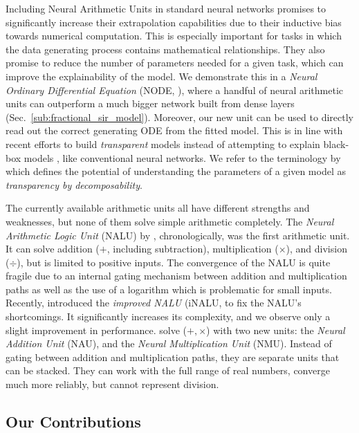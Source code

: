 \documentclass[9pt]{article}
\begin{document}
Including Neural Arithmetic Units in standard neural networks promises to
significantly increase their extrapolation capabilities due to their inductive
bias towards numerical computation. This is especially important for tasks in which
the data generating process contains mathematical relationships.  They also
promise to reduce the number of parameters needed for a given
task, which can improve the explainability of the model.
We demonstrate this in a \emph{Neural Ordinary Differential Equation} (NODE,
\cite{chen_neural_2019}), where a handful of neural arithmetic units can
outperform a much bigger network built from dense layers (Sec.~\ref{sub:fractional_sir_model}).
Moreover, our new unit can be used to directly read out the correct generating ODE
from the fitted model.  This is in line with recent efforts to build
\emph{transparent} models instead of attempting to explain black-box models
\citep{rudin_stop_2019}, like conventional neural networks.
We refer to the terminology by \cite{lipton_mythos_2017} which defines the
potential of understanding the parameters of a given model as \emph{transparency by decomposability}.

The currently available arithmetic units all have different strengths and
weaknesses, but none of them solve simple arithmetic completely.
The \emph{Neural Arithmetic Logic Unit} (NALU) by \cite{trask_neural_2018},
chronologically, was the first arithmetic unit. It can solve
addition ($+$, including subtraction), multiplication ($\times$), and division
($\div$), but is limited to positive inputs. The convergence of the
NALU is quite fragile due to an internal gating mechanism between addition and
multiplication paths as well as the use of a logarithm which is problematic for
small inputs.  Recently, \cite{schlor_inalu_2020} introduced the \emph{improved NALU} (iNALU,
to fix the NALU's shortcomings. It significantly increases its complexity, and we
observe only a slight improvement in performance.
\cite{madsen_neural_2020} solve ($+,\times$) with two new units: the
\emph{Neural Addition Unit} (NAU), and the \emph{Neural Multiplication Unit}
(NMU). Instead of gating between addition and multiplication paths, they are
separate units that can be stacked. They can work with the full range of real
numbers, converge much more reliably, but cannot represent
division.


\subsection*{Our Contributions}%
\label{sub:our_contribution}
\end{document}
